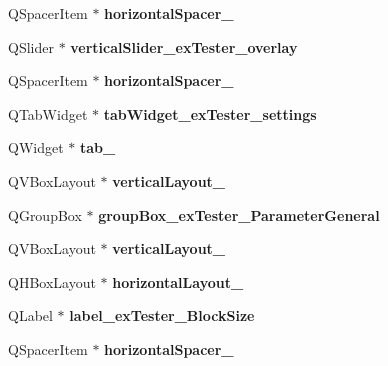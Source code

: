 \begin{DoxyCompactItemize}
Q\+Spacer\+Item $\ast$ {\bfseries horizontal\+Spacer\+\_}
\item 
\mbox{\label{class_ui___main_window_a536432a96f8730b779ecae93178d059b}} 
Q\+Slider $\ast$ {\bfseries vertical\+Slider\+\_\+ex\+Tester\+\_\+overlay}
\item 
\mbox{\label{class_ui___main_window_a9475ee59a6a4a878f3459613ce894eb9}} 
Q\+Spacer\+Item $\ast$ {\bfseries horizontal\+Spacer\+\_}
\item 
\mbox{\label{class_ui___main_window_a333bde6150f68c1132c1bed26113e233}} 
Q\+Tab\+Widget $\ast$ {\bfseries tab\+Widget\+\_\+ex\+Tester\+\_\+settings}
\item 
\mbox{\label{class_ui___main_window_a193f7d89d896d9369f4a1173de796fd1}} 
Q\+Widget $\ast$ {\bfseries tab\+\_}
\item 
\mbox{\label{class_ui___main_window_a8243c872f26a92aa7905d7b9955a4782}} 
Q\+V\+Box\+Layout $\ast$ {\bfseries vertical\+Layout\+\_}
\item 
\mbox{\label{class_ui___main_window_af229c90978391fd3c11c9a97b44bd598}} 
Q\+Group\+Box $\ast$ {\bfseries group\+Box\+\_\+ex\+Tester\+\_\+\+Parameter\+General}
\item 
\mbox{\label{class_ui___main_window_a2e7473330f1357d85d85d59ac51b0cad}} 
Q\+V\+Box\+Layout $\ast$ {\bfseries vertical\+Layout\+\_}
\item 
\mbox{\label{class_ui___main_window_adcff2aff64f0a6604d041bb7459a2647}} 
Q\+H\+Box\+Layout $\ast$ {\bfseries horizontal\+Layout\+\_}
\item 
\mbox{\label{class_ui___main_window_a8f0b68e753fd34806295422da88082fe}} 
Q\+Label $\ast$ {\bfseries label\+\_\+ex\+Tester\+\_\+\+Block\+Size}
\item 
\mbox{\label{class_ui___main_window_a851bbc49a589eb9bdf5fa175bf4cbcad}} 
Q\+Spacer\+Item $\ast$ {\bfseries horizontal\+Spacer\+\_}

\end{DoxyCompactItemize}
